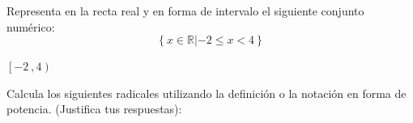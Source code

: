 \documentclass[addpoints,spanish, 12pt,a4paper]{exam}
\begin{document}
\begin{questions}
\addpoints

\question[2] Representa en la recta real y en forma de intervalo el siguiente conjunto numérico:
\addpoints %
$$\left\{ x \in \mathbb{R} \left| -2 \leqslant x < 4 \right. \right\}$$

\begin{solution}
$\left[-2 \ , 4\right)$ 
\end{solution}

\question Calcula los siguientes radicales utilizando la definición o la notación en forma de potencia. (Justifica tus respuestas):

\addpoints


\end{questions}
\end{document}
